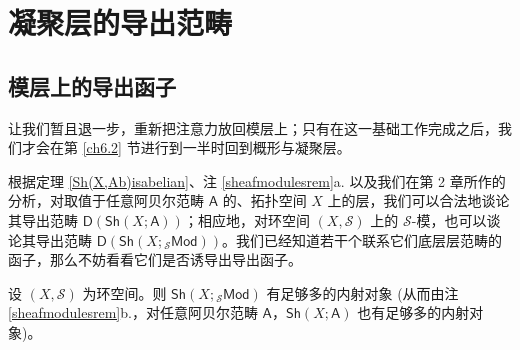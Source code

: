 \section{凝聚层的导出范畴}
\thispagestyle{plain}


\subsection{模层上的导出函子}\label{ch6.1}

让我们暂且退一步，重新把注意力放回模层上；只有在这一基础工作完成之后，我们才会在第 \ref{ch6.2} 节进行到一半时回到概形与凝聚层。

根据定理 \ref{Sh(X,Ab)isabelian}、注 \ref{sheafmodulesrem}a. 以及我们在第 2 章所作的分析，对取值于任意阿贝尔范畴 $\mathsf{A}$ 的、拓扑空间 $X$ 上的层，我们可以合法地谈论其导出范畴 $\mathsf{D}(\mathsf{Sh}(X;\mathsf{A}))$；相应地，对环空间 $(X,\mathcal{S})$ 上的 $\mathcal{S}$-模，也可以谈论其导出范畴 $\mathsf{D}(\mathsf{Sh}(X;{}_\mathcal{S}\mathsf{Mod}))$。我们已经知道若干个联系它们底层层范畴的函子，那么不妨看看它们是否诱导出导出函子。

\begin{Pro}\label{enoughinjectivemodules}
设 $(X,\mathcal{S})$ 为环空间。则 $\mathsf{Sh}(X;{}_\mathcal{S}\mathsf{Mod})$ 有足够多的内射对象 \textup(从而由注 \ref{sheafmodulesrem}b.，对任意阿贝尔范畴 $\mathsf{A}$，$\mathsf{Sh}(X;\mathsf{A})$ 也有足够多的内射对象\textup)。
\end{Pro}

